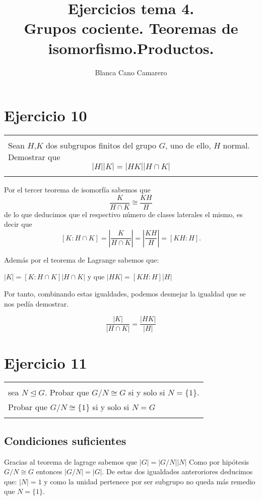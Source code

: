\documentclass[12pt]{article}
\title{Ejercicios tema 4. \\
Grupos cociente. Teoremas de isomorfismo.Productos.}
\author{Blanca Cano Camarero}
\newenvironment{micaja}
{
    \begin{center}
    \begin{tabular}{|p{0.9\textwidth}|}
    \hline\\
    }   
    {   
    \\\\\hline
    \end{tabular} 
    \end{center}
    }
\begin{document}
\begin{titlepage}
\maketitle
\tableofcontents
\end{titlepage}

\section{Ejercicio 10}

\begin{micaja}
    Sean $H$,$K$ dos subgrupos finitos del grupo $G$, uno de ello, $H$ normal. Demostrar que 
    $$|H||K| = |HK||H \cap K|$$
\end{micaja}

Por el tercer teorema de isomorfía sabemos que 
$$\frac{K}{H \cap K} \cong \frac{KH}{H}$$
de lo que deducimos que el respectivo número de clases laterales el mismo, es decir que 
$$[K: H \cap K] = \left|\frac{K}{H \cap K} \right| =  \left| \frac{KH}{H} \right| = [KH:H].$$

Además por el teorema de Lagrange sabemos que: 

$|K| = [K: H \cap K] |H \cap K|$ y que $|HK| = [KH:H]|H|$

Por tanto, combinando estas igualdades, podemos desmejar la igualdad que se nos pedía demostrar. 

$$\frac{|K|}{|H \cap K|} = \frac{|HK|}{|H|}$$

\newpage

\section{Ejercicio 11}

\begin{micaja}
    sea $N \trianglelefteq G.$ Probar que $G/N \cong G$ si y solo si $N=\{1\}.$\\
     Probar que $G/N \cong \{1\}$ si y solo si $N=G$
\end{micaja}
\subsection*{Condiciones suficientes}
Gracias al teorema de lagrage sabemos que $|G| = |G/N||N|$
Como  por hipótesis  $G/N \cong G$ entonces $|G/N| = |G|$. 
De estas dos igualdades anteroriores deducimos que: $|N|=1$ y 
como la unidad pertenece por ser subgrupo no queda más remedio que $N=\{1\}.$
\end{document}
